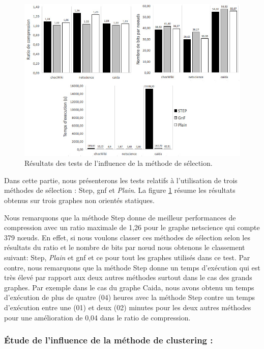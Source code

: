 		\begin{figure}[H]
	
			
			\includegraphics[scale=0.7]{ressources/image/vogcond.jpg}
			
			\caption{Résultats des tests de l'influence de la méthode de sélection.}
			\label{fig:test-vogcond}
	
		\end{figure}
		
		Dans cette partie, nous présenterons les tests relatifs à l'utilisation de trois méthodes de sélection : Step, \gls{gnf} et \textit{Plain}. La figure \ref{fig:test-vogcond} résume les résultats obtenus sur  trois graphes non orientés statiques.
		
		Nous remarquons que la méthode Step donne de meilleur performances de compression avec un ratio maximale de 1,26 pour le graphe netscience qui compte 379 nœuds. En effet, si nous voulons classer ces méthodes de sélection selon les résultats du ratio et le nombre de bits par nœud nous obtenons le classement suivant: Step, \textit{Plain} et \gls{gnf} et ce pour tout les graphes utilisés dans ce test. Par contre, nous remarquons que la méthode Step donne un temps d'exécution qui est très élevé par rapport aux deux autres méthodes surtout dans le cas des grands graphes. Par exemple dans le cas du graphe Caida, nous avons obtenu un temps d'exécution de plus de quatre (04) heures avec la méthode Step  contre un temps d'exécution entre une (01) et deux (02) minutes pour les deux autres méthodes pour une amélioration de 0,04 dans le ratio de compression.
		
		\subsubsection{Étude de l'influence de la méthode de clustering :}	
		
